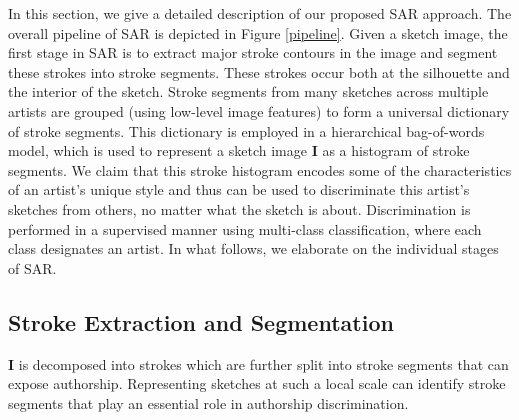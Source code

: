 In this section, we give a detailed description of our proposed SAR approach. The overall pipeline of SAR is depicted in Figure \ref{pipeline}. Given a sketch image, the first stage in SAR is to extract major stroke contours in the image and segment these strokes into stroke segments. These strokes occur both at the silhouette and the interior of the sketch. Stroke segments from many sketches across multiple artists are grouped (using low-level image features) to form a universal dictionary of stroke segments. This dictionary is employed in a hierarchical bag-of-words model, which is used to represent a sketch image $\mathbf{I}$ as a histogram of stroke segments. We claim that this stroke histogram encodes some of the characteristics of an artist's unique style and thus can be used to discriminate this artist's sketches from others, no matter what the sketch is about. Discrimination is performed in a supervised manner using multi-class classification, where each class designates an artist. In what follows, we elaborate on the individual stages of SAR.
\vspace{-4mm}
\subsection{Stroke Extraction and Segmentation}\label{subsec: segmentation}
\vspace{-1mm}
 $\mathbf{I}$ is decomposed into strokes which are further split into stroke segments that can expose authorship. Representing sketches at such a local scale can identify stroke segments that play an essential role in authorship discrimination.

